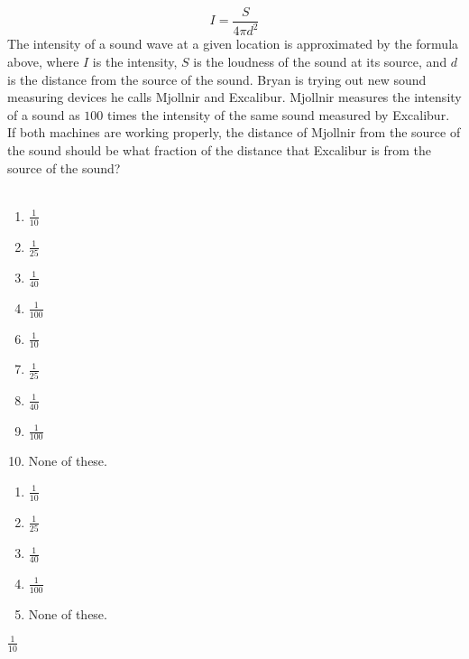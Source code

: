  
$$ I=\frac{S}{4\pi d^2}$$
The intensity of a sound wave at a given location is approximated by the formula above, where $I$ is the intensity, $S$ is the loudness of the sound at its source, and $d$ is the distance from the source of the sound.  Bryan is trying out new sound measuring devices he calls Mjollnir and Excalibur.  Mjollnir measures the intensity of a sound as $100$ times the intensity of the same sound measured by Excalibur.  If both machines are working properly, the distance of Mjollnir from the source of the sound should be what fraction of the distance that Excalibur is from the source of the sound?\\ \\


\ifsat
	\begin{enumerate}[label=\Alph*)]
		\item $\frac{1}{10} $ %
		\item $\frac{1}{25} $ 
		\item $\frac{1}{40} $ 
		\item $\frac{1}{100} $
	\end{enumerate}
\else
\fi

\ifacteven
	\begin{enumerate}[label=\textbf{\Alph*.},itemsep=\fill,align=left]
		\setcounter{enumii}{5}
		\item $\frac{1}{10} $ %
		\item $\frac{1}{25} $ 
		\item $\frac{1}{40} $ 
		\addtocounter{enumii}{1}
		\item $\frac{1}{100} $
		\item None of these. 
	\end{enumerate}
\else
\fi

\ifactodd
	\begin{enumerate}[label=\textbf{\Alph*.},itemsep=\fill,align=left]
		\item $\frac{1}{10} $ %
		\item $\frac{1}{25} $ 
		\item $\frac{1}{40} $ 
		\item $\frac{1}{100} $
		\item None of these. 
	\end{enumerate}
\else
\fi

\ifgridin
 $\frac{1}{10} $ %
		
\else
\fi

